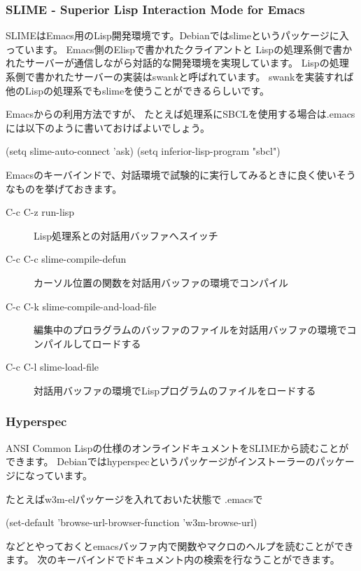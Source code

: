 \documentclass[mingoth,a4paper]{jsarticle}
\begin{document}
\subsubsection{SLIME - Superior Lisp Interaction Mode for Emacs}

SLIMEはEmacs用のLisp開発環境です。Debianではslimeというパッケージに入っています。
Emacs側のElispで書かれたクライアントと
Lispの処理系側で書かれたサーバーが通信しながら対話的な開発環境を実現しています。
Lispの処理系側で書かれたサーバーの実装はswankと呼ばれています。
swankを実装すれば他のLispの処理系でもslimeを使うことができるらしいです。

Emacsからの利用方法ですが、
たとえば処理系にSBCLを使用する場合は.emacsには以下のように書いておけばよいでしょう。

\begin{commandline}
(setq slime-auto-connect 'ask)
(setq inferior-lisp-program "sbcl")
\end{commandline}

Emacsのキーバインドで、対話環境で試験的に実行してみるときに良く使いそうなものを挙げておきます。

\begin{description}
\item[C-c C-z run-lisp]
 Lisp処理系との対話用バッファへスイッチ
\item[C-c C-c slime-compile-defun]
 カーソル位置の関数を対話用バッファの環境でコンパイル
\item[C-c C-k slime-compile-and-load-file]
 編集中のプロラグラムのバッファのファイルを対話用バッファの環境でコンパイルしてロードする
\item[C-c C-l slime-load-file]
  対話用バッファの環境でLispプログラムのファイルをロードする
\end{description}

\subsubsection{Hyperspec}

ANSI Common Lispの仕様のオンラインドキュメントをSLIMEから読むことができます。
Debianではhyperspecというパッケージがインストーラーのパッケージになっています。

たとえばw3m-elパッケージを入れておいた状態で .emacsで

\begin{commandline}
(set-default 'browse-url-browser-function 'w3m-browse-url)
\end{commandline}

などとやっておくとemacsバッファ内で関数やマクロのヘルプを読むことができます。
次のキーバインドでドキュメント内の検索を行なうことができます。
\end{document}
